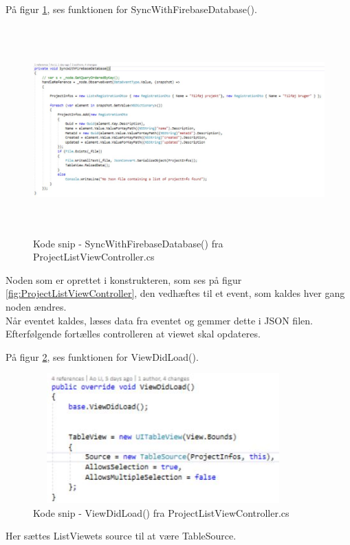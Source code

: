 På figur \ref{fig:SyncWithDB}, ses funktionen for SyncWithFirebaseDatabase().
\begin{figure}[H] %
	\centering
	\includegraphics[height=8cm, width=15cm]{../ArkitekturDesign/Design/ProjectList/SyncWithDB}
	\caption{Kode snip - SyncWithFirebaseDatabase() fra ProjectListViewController.cs}
	\label{fig:SyncWithDB}
\end{figure}
Noden som er oprettet i konstrukteren, som ses på figur \ref{fig:ProjectListViewController}, den vedhæftes til et event, som kaldes hver gang noden ændres. \\
Når eventet kaldes, læses data fra eventet og gemmer dette i JSON filen. Efterfølgende fortælles controlleren at viewet skal opdateres.

På figur \ref{fig:ViewDidLoad}, ses funktionen for ViewDidLoad().
\begin{figure}[H] %
	\centering
	\includegraphics[height=5cm, width=10cm]{../ArkitekturDesign/Design/ProjectList/ViewDidLoad}
	\caption{Kode snip - ViewDidLoad() fra ProjectListViewController.cs}
	\label{fig:ViewDidLoad}
\end{figure}
Her sættes ListViewets source til at være TableSource.

\clearpage

